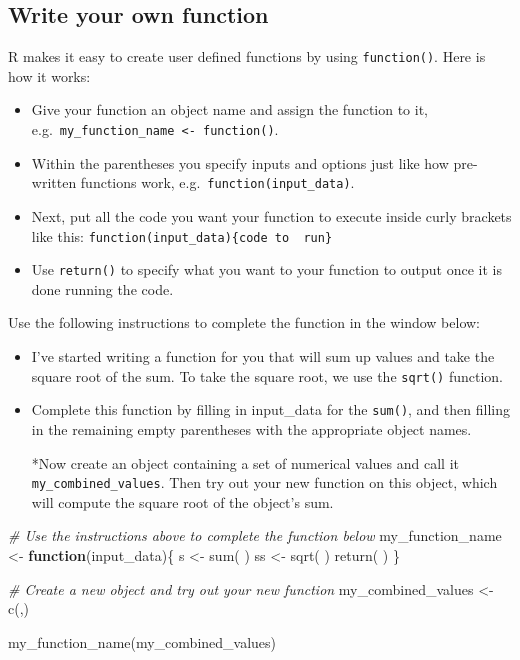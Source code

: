 \documentclass[
]{book}
\newenvironment{Shaded}{\begin{snugshade}}{\end{snugshade}}
\newcommand{\CommentTok}[1]{\textcolor[rgb]{0.56,0.35,0.01}{\textit{#1}}}
\newcommand{\ControlFlowTok}[1]{\textcolor[rgb]{0.13,0.29,0.53}{\textbf{#1}}}
\newcommand{\FunctionTok}[1]{\textcolor[rgb]{0.00,0.00,0.00}{#1}}
\newcommand{\NormalTok}[1]{#1}
\newcommand{\OtherTok}[1]{\textcolor[rgb]{0.56,0.35,0.01}{#1}}
\begin{document}
\hypertarget{write-your-own-function}{%
\subsection{Write your own function}\label{write-your-own-function}}

R makes it easy to create user defined functions by using \texttt{function()}. Here is how it works:

\begin{itemize}
\item
  Give your function an object name and assign the function to it, e.g.~\texttt{my\_function\_name\ \textless{}-\ function()}.
\item
  Within the parentheses you specify inputs and options just like how pre-written functions work, e.g.~\texttt{function(input\_data)}.
\item
  Next, put all the code you want your function to execute inside curly brackets like this: \texttt{function(input\_data)\{code\ to\ \ run\}}
\item
  Use \texttt{return()} to specify what you want to your function to output once it is done running the code.
\end{itemize}

Use the following instructions to complete the function in the window below:

\begin{itemize}
\item
  I've started writing a function for you that will sum up values and take the square root of the sum. To take the square root, we use the \texttt{sqrt()} function.
\item
  Complete this function by filling in input\_data for the \texttt{sum()}, and then filling in the remaining empty parentheses with the appropriate object names.

  *Now create an object containing a set of numerical values and call it \texttt{my\_combined\_values}. Then try out your new function on this object, which will compute the square root of the object's sum.
\end{itemize}

\begin{Shaded}
\begin{Highlighting}[]
\CommentTok{\# Use the instructions above to complete the function below}
\NormalTok{my\_function\_name }\OtherTok{\textless{}{-}} \ControlFlowTok{function}\NormalTok{(input\_data)\{}
\NormalTok{  s }\OtherTok{\textless{}{-}} \FunctionTok{sum}\NormalTok{( )}
\NormalTok{  ss }\OtherTok{\textless{}{-}} \FunctionTok{sqrt}\NormalTok{( )}
  \FunctionTok{return}\NormalTok{( )}
\NormalTok{\}}

\CommentTok{\# Create a new object and try out your new function}
\NormalTok{my\_combined\_values }\OtherTok{\textless{}{-}} \FunctionTok{c}\NormalTok{(,) }

\FunctionTok{my\_function\_name}\NormalTok{(my\_combined\_values)}
\end{Highlighting}
\end{Shaded}
\end{document}
